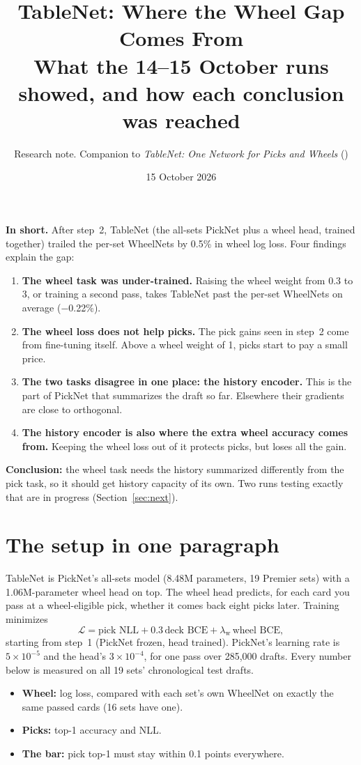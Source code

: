 \documentclass[11pt,letterpaper]{article}
\title{\Large\bfseries TableNet: Where the Wheel Gap Comes From\\[2pt]\large What the 14--15 October runs showed,
and how each conclusion was reached}
\author{Research note. Companion to \emph{TableNet: One Network for Picks and Wheels} (\code{architecture.tex})}
\date{\small 15 October 2026}
\newcommand{\lw}{\lambda_{\text{w}}}
\begin{document}
\maketitle

\noindent\colorbox{cpanel}{\parbox{\dimexpr\linewidth-2\fboxsep}{\small
\textbf{In short.} After step~2, TableNet (the all-sets PickNet plus a wheel head, trained together) trailed the
per-set WheelNets by 0.5\% in wheel log loss. Four findings explain the gap:
\begin{enumerate}[leftmargin=1.6em,itemsep=1pt,topsep=2pt]
\item \textbf{The wheel task was under-trained.} Raising the wheel weight from 0.3 to 3, or training a second
pass, takes TableNet past the per-set WheelNets on average ($-$0.22\%).
\item \textbf{The wheel loss does not help picks.} The pick gains seen in step~2 come from fine-tuning itself.
Above a wheel weight of 1, picks start to pay a small price.
\item \textbf{The two tasks disagree in one place: the history encoder.} This is the part of PickNet that
summarizes the draft so far. Elsewhere their gradients are close to orthogonal.
\item \textbf{The history encoder is also where the extra wheel accuracy comes from.} Keeping the wheel loss out
of it protects picks, but loses all the gain.
\end{enumerate}
\textbf{Conclusion:} the wheel task needs the history summarized differently from the pick task, so it should get
history capacity of its own. Two runs testing exactly that are in progress (Section~\ref{sec:next}).}}

\section{The setup in one paragraph}

TableNet is PickNet's all-sets model (8.48M parameters, 19 Premier sets) with a 1.06M-parameter wheel head on top.
The wheel head predicts, for each card you pass at a wheel-eligible pick, whether it comes back eight picks later.
Training minimizes
\[ \mathcal L = \text{pick NLL} + 0.3\,\text{deck BCE} + \lw\,\text{wheel BCE}, \]
starting from step~1 (PickNet frozen, head trained). PickNet's learning rate is $5{\times}10^{-5}$ and the
head's $3{\times}10^{-4}$, for one pass over 285,000 drafts. Every number below is measured on all 19 sets'
chronological test drafts.
\begin{itemize}
\item \textbf{Wheel:} log loss, compared with each set's own WheelNet on exactly the same passed cards (16 sets
have one).
\item \textbf{Picks:} top-1 accuracy and NLL.
\item \textbf{The bar:} pick top-1 must stay within 0.1 points everywhere.
\end{itemize}
\end{document}
